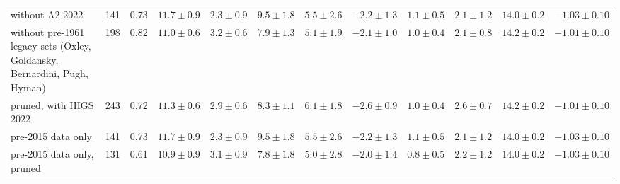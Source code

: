 \begin{tabular}{l r c cccc ccc cc}
without A2 2022 & 141 & 0.73 & $11.7\pm0.9$ & $2.3\pm0.9$ & $9.5\pm1.8$ & $5.5\pm2.6$ & $-2.2\pm1.3$ & $1.1\pm0.5$ & $2.1\pm1.2$ & $14.0\pm0.2$ & $-1.03\pm0.10$\\
without pre-1961 legacy sets (Oxley, Goldansky, Bernardini, Pugh, Hyman) & 198 & 0.82 & $11.0\pm0.6$ & $3.2\pm0.6$ & $7.9\pm1.3$ & $5.1\pm1.9$ & $-2.1\pm1.0$ & $1.0\pm0.4$ & $2.1\pm0.8$ & $14.2\pm0.2$ & $-1.01\pm0.10$\\
pruned, with HIGS 2022 & 243 & 0.72 & $11.3\pm0.6$ & $2.9\pm0.6$ & $8.3\pm1.1$ & $6.1\pm1.8$ & $-2.6\pm0.9$ & $1.0\pm0.4$ & $2.6\pm0.7$ & $14.2\pm0.2$ & $-1.01\pm0.10$\\
pre-2015 data only & 141 & 0.73 & $11.7\pm0.9$ & $2.3\pm0.9$ & $9.5\pm1.8$ & $5.5\pm2.6$ & $-2.2\pm1.3$ & $1.1\pm0.5$ & $2.1\pm1.2$ & $14.0\pm0.2$ & $-1.03\pm0.10$\\
pre-2015 data only, pruned & 131 & 0.61 & $10.9\pm0.9$ & $3.1\pm0.9$ & $7.8\pm1.8$ & $5.0\pm2.8$ & $-2.0\pm1.4$ & $0.8\pm0.5$ & $2.2\pm1.2$ & $14.0\pm0.2$ & $-1.03\pm0.10$\\
\hline
\end{tabular}

